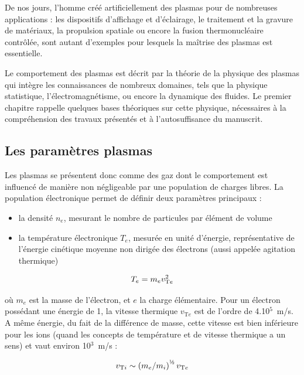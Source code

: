 \begin{refsection}
De nos jours, l'homme créé artificiellement des plasmas pour de nombreuses
applications : les dispositifs d'affichage et d'éclairage, le traitement et la
gravure de matériaux, la propulsion spatiale ou encore la fusion
thermonucléaire contrôlée, sont autant d'exemples pour lesquels la maîtrise des
plasmas est essentielle.

Le comportement des plasmas est décrit par la théorie de la physique des
plasmas qui intègre les connaissances de nombreux domaines, tels que la
physique statistique, l'électromagnétisme, ou encore la dynamique des fluides.
Le premier chapitre rappelle quelques bases théoriques sur cette physique,
nécessaires à la compréhension des travaux présentés et à l'autosuffisance du manuscrit.

\subsection{Les paramètres plasmas}
Les plasmas se présentent donc comme des gaz dont le comportement est influencé
de manière non négligeable par une population de charges libres.
La population électronique permet de définir deux paramètres principaux :

\begin{itemize}
  \item la densité $n_e$, mesurant le nombre
  de particules par élément de volume
  \item la température électronique $T_e$, mesurée en unité d'énergie,
  représentative de l'énergie cinétique moyenne non dirigée des électrons (aussi appelée
   agitation thermique)
\end{itemize}

\begin{equation}
\label{1-VThermique}
	T_{e}=m_{e} v_{\text{T}{e}}^{{2}}
\end{equation}

où $m_{e}$ est la masse de l'électron, et $e$ la charge élémentaire. Pour un
électron possédant une énergie de \unit{1}{\electronvolt}, la vitesse thermique
$v_{\text{T}{e}}$ est de l'ordre de 4.10$^5$~m/s. A même énergie, du fait de la
différence de masse, cette vitesse est bien inférieure pour les ions (quand les
concepts de température et de vitesse thermique a un sens) et vaut environ 10$^3 $~m/s :

\begin{equation}
	v_{\text{T}{i}}\sim\left(m_{e}/m_{i}\right)^{\text{\textonehalf}}
	v_{\text{T}{e}}
\end{equation}


\end{refsection}
